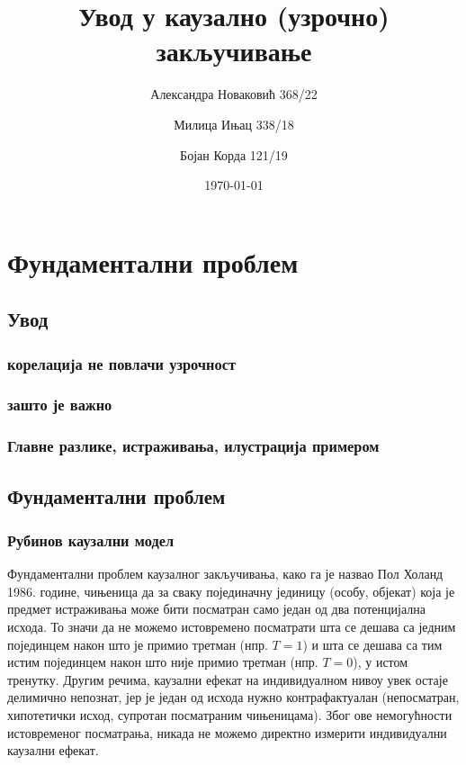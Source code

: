 \documentclass[12pt, a4paper]{article}
\title{Увод у каузално (узрочно) закључивање}
\author{Александра Новаковић 368/22}
\author{Милица Ињац 338/18}
\author{Бојан Корда 121/19}
\affil{Математички факултет, Универзитет у Београду}
\date{\today}
\begin{document}
\maketitle
\newpage

\tableofcontents
\newpage

\section{Фундаментални проблем}
    \subsection{Увод}
    \subsubsection{корелација не повлачи узрочност}
    \subsubsection{зашто је важно}
    \subsubsection{Главне разлике, истраживања, илустрација примером}
\subsection{Фундаментални проблем}
    \subsubsection{Рубинов каузални модел}

Фундаментални проблем каузалног закључивања, како га је назвао Пол Холанд 1986. године, чињеница да за сваку појединачну јединицу (особу, објекат) која је 
предмет истраживања може бити посматран само један од два потенцијална исхода. То значи да не можемо истовремено посматрати шта се дешава са једним појединцем након 
што је примио третман (нпр. $T=1$) и шта се дешава са тим истим појединцем након што није примио третман (нпр. $T=0$), у истом тренутку. Другим речима, каузални ефекат 
на индивидуалном нивоу увек остаје делимично непознат, јер је један од исхода нужно контрафактуалан (непосматран, хипотетички исход, супротан посматраним чињеницама).
Због ове немогућности истовременог посматрања, никада не можемо директно измерити индивидуални каузални ефекат.
\end{document}
